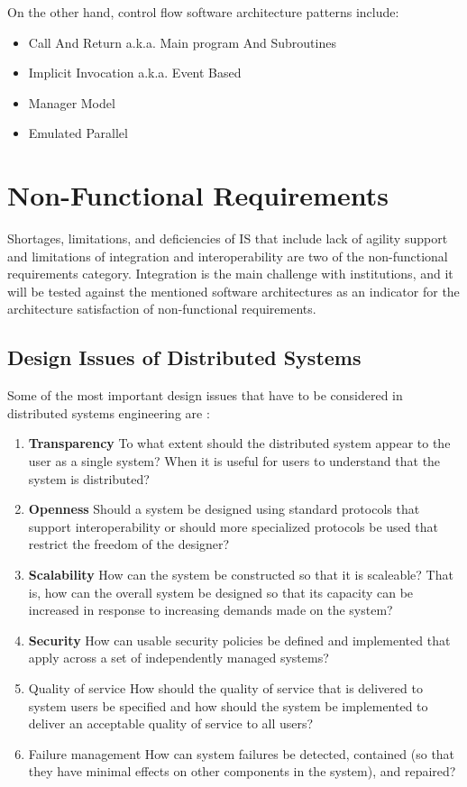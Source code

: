 \documentclass[12pt,a4paper,final,twoside,onecolumn,titlepage]{book}
\begin{document}
On the other hand, control flow software architecture patterns include:
\begin{itemize}
\item Call And Return a.k.a. Main program And Subroutines
\item Implicit Invocation a.k.a. Event Based
\item Manager Model
\item Emulated Parallel
\end{itemize}


\section{Non-Functional Requirements}
Shortages, limitations, and deficiencies of \gls{IS} that include lack of agility support and limitations of integration and interoperability are two of the non-functional requirements category. Integration is the main challenge with institutions, and it will be tested against the mentioned software architectures as an indicator for the architecture satisfaction of non-functional requirements.

\subsection{Design Issues of Distributed Systems}
Some of the most important design issues that have to be considered in distributed systems engineering are \cite{SWE9}:
\begin{enumerate}
\item \textbf{Transparency} To what extent should the distributed system appear to the user as a single system? When it is useful for users to understand that the system is distributed?
\item \textbf{Openness} Should a system be designed using standard protocols that support interoperability or should more specialized protocols be used that restrict the freedom of the designer?
\item \textbf{Scalability} How can the system be constructed so that it is scaleable? That is, how can the overall system be designed so that its capacity can be increased in response to increasing demands made on the system?
\item \textbf{Security} How can usable security policies be defined and implemented that apply across a set of independently managed systems?
\item Quality of service How should the quality of service that is delivered to system users be specified and how should the system be implemented to deliver an acceptable quality of service to all users?
\item Failure management How can system failures be detected, contained (so that they have minimal effects on other components in the system), and repaired?
\end{enumerate}
\end{document}
